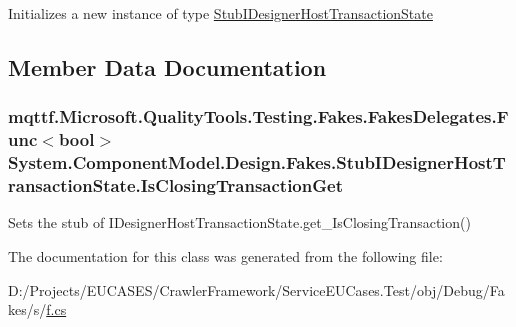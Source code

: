 Initializes a new instance of type \hyperlink{class_system_1_1_component_model_1_1_design_1_1_fakes_1_1_stub_i_designer_host_transaction_state}{Stub\-I\-Designer\-Host\-Transaction\-State}



\subsection{Member Data Documentation}
\hypertarget{class_system_1_1_component_model_1_1_design_1_1_fakes_1_1_stub_i_designer_host_transaction_state_a1f1f1de6c0494cd2667cf2c039d8bc49}{
\subsubsection[{Is\-Closing\-Transaction\-Get}]{\setlength{\rightskip}{0pt plus 5cm}mqttf.\-Microsoft.\-Quality\-Tools.\-Testing.\-Fakes.\-Fakes\-Delegates.\-Func$<$bool$>$ System.\-Component\-Model.\-Design.\-Fakes.\-Stub\-I\-Designer\-Host\-Transaction\-State.\-Is\-Closing\-Transaction\-Get}}\label{class_system_1_1_component_model_1_1_design_1_1_fakes_1_1_stub_i_designer_host_transaction_state_a1f1f1de6c0494cd2667cf2c039d8bc49}


Sets the stub of I\-Designer\-Host\-Transaction\-State.\-get\-\_\-\-Is\-Closing\-Transaction()



The documentation for this class was generated from the following file\-:\begin{DoxyCompactItemize}
\item 
D\-:/\-Projects/\-E\-U\-C\-A\-S\-E\-S/\-Crawler\-Framework/\-Service\-E\-U\-Cases.\-Test/obj/\-Debug/\-Fakes/s/\hyperlink{s_2f_8cs}{f.\-cs}\end{DoxyCompactItemize}
